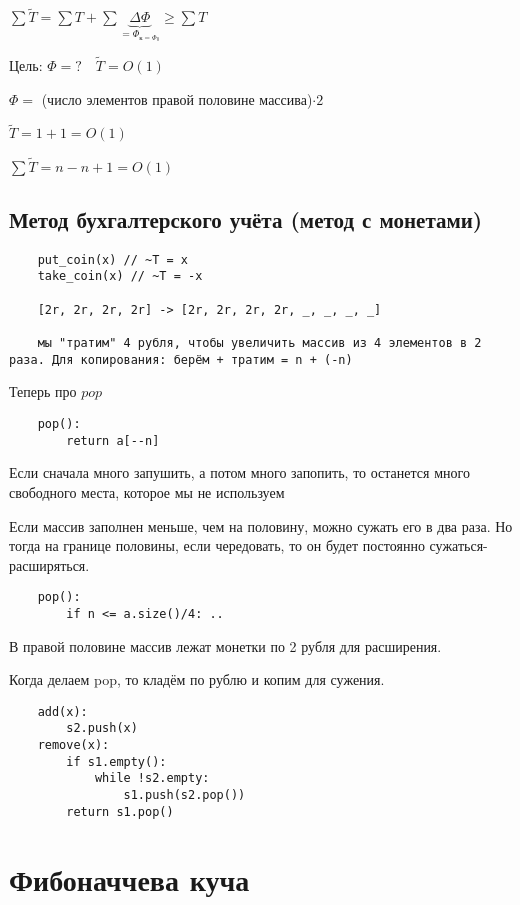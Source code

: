 \documentclass{book}
\theoremstyle{definition}
\begin{document}
 $\sum \widetilde T = \sum T + \sum \underbrace{\Delta\Phi}\limits_{=\Phi_{\text{к}=\Phi_0}} \geqslant \sum T$

 Цель: $\Phi = ?\quad \widetilde T = O(1)$

 $\Phi=$ (число элементов правой половине массива)$\cdot 2$

 $\widetilde T = 1 +1 = O(1)$

 $\sum \widetilde T = n-n+1 = O(1)$

\subsection{Метод бухгалтерского учёта (метод с монетами)}
\begin{verbatim}
    put_coin(x) // ~T = x
    take_coin(x) // ~T = -x

    [2r, 2r, 2r, 2r] -> [2r, 2r, 2r, 2r, _, _, _, _]

    мы "тратим" 4 рубля, чтобы увеличить массив из 4 элементов в 2 раза. Для копирования: берём + тратим = n + (-n)  

\end{verbatim}

Теперь про $pop$

 \begin{verbatim}
    pop():
        return a[--n]
\end{verbatim}

Если сначала много запушить, а потом много запопить, то останется много свободного места, которое мы не используем

Если массив заполнен меньше, чем на половину, можно сужать его в два раза. Но тогда на границе половины, если чередовать, то он будет постоянно сужаться-расширяться.

\begin{verbatim}
    pop():
        if n <= a.size()/4: ..
\end{verbatim}

В правой половине массив лежат монетки по 2 рубля для расширения.

Когда делаем pop, то кладём по рублю и копим для сужения. 

\begin{verbatim}
    add(x):
        s2.push(x)
    remove(x):
        if s1.empty():
            while !s2.empty:
                s1.push(s2.pop())
        return s1.pop()
\end{verbatim}

\section{Фибоначчева куча}
\end{document}
